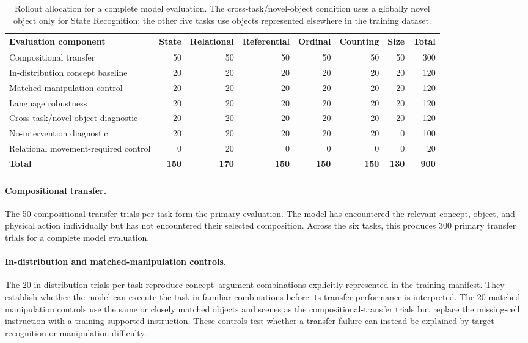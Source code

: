 \begin{table}[t]
\centering
\small
\caption{Rollout allocation for a complete model evaluation. The cross-task/novel-object condition uses a globally novel object only for State Recognition; the other five tasks use objects represented elsewhere in the training dataset.}
\label{tab:evaluation_allocation}
\begin{tabular}{lrrrrrrr}
\toprule
\textbf{Evaluation component} & \textbf{State} & \textbf{Relational} & \textbf{Referential} & \textbf{Ordinal} & \textbf{Counting} & \textbf{Size} & \textbf{Total} \\
\midrule
Compositional transfer & 50 & 50 & 50 & 50 & 50 & 50 & 300 \\
In-distribution concept baseline & 20 & 20 & 20 & 20 & 20 & 20 & 120 \\
Matched manipulation control & 20 & 20 & 20 & 20 & 20 & 20 & 120 \\
Language robustness & 20 & 20 & 20 & 20 & 20 & 20 & 120 \\
Cross-task/novel-object diagnostic & 20 & 20 & 20 & 20 & 20 & 20 & 120 \\
No-intervention diagnostic & 20 & 20 & 20 & 20 & 20 & 0 & 100 \\
Relational movement-required control & 0 & 20 & 0 & 0 & 0 & 0 & 20 \\
\midrule
\textbf{Total} & \textbf{150} & \textbf{170} & \textbf{150} & \textbf{150} & \textbf{150} & \textbf{130} & \textbf{900} \\
\bottomrule
\end{tabular}
\end{table}

\paragraph{Compositional transfer.}
The 50 compositional-transfer trials per task form the primary evaluation. The model has encountered the relevant concept, object, and physical action individually but has not encountered their selected composition. Across the six tasks, this produces 300 primary transfer trials for a complete model evaluation.

\paragraph{In-distribution and matched-manipulation controls.}
The 20 in-distribution trials per task reproduce concept--argument combinations explicitly represented in the training manifest. They establish whether the model can execute the task in familiar combinations before its transfer performance is interpreted. The 20 matched-manipulation controls use the same or closely matched objects and scenes as the compositional-transfer trials but replace the missing-cell instruction with a training-supported instruction. These controls test whether a transfer failure can instead be explained by target recognition or manipulation difficulty.

